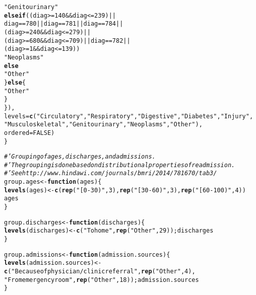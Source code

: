 \documentclass{article}\usepackage[]{graphicx}\usepackage[]{color}
\makeatletter
\newcommand{\hlnum}[1]{\textcolor[rgb]{0.686,0.059,0.569}{#1}}%
\newcommand{\hlstr}[1]{\textcolor[rgb]{0.192,0.494,0.8}{#1}}%
\newcommand{\hlcom}[1]{\textcolor[rgb]{0.678,0.584,0.686}{\textit{#1}}}%
\newcommand{\hlopt}[1]{\textcolor[rgb]{0,0,0}{#1}}%
\newcommand{\hlstd}[1]{\textcolor[rgb]{0.345,0.345,0.345}{#1}}%
\newcommand{\hlkwa}[1]{\textcolor[rgb]{0.161,0.373,0.58}{\textbf{#1}}}%
\newcommand{\hlkwb}[1]{\textcolor[rgb]{0.69,0.353,0.396}{#1}}%
\newcommand{\hlkwc}[1]{\textcolor[rgb]{0.333,0.667,0.333}{#1}}%
\newcommand{\hlkwd}[1]{\textcolor[rgb]{0.737,0.353,0.396}{\textbf{#1}}}%
\newenvironment{kframe}{%
 \def\at@end@of@kframe{}%
 \ifinner\ifhmode%
  \def\at@end@of@kframe{\end{minipage}}%
  \begin{minipage}{\columnwidth}%
 \fi\fi%
 \def\FrameCommand##1{\hskip\@totalleftmargin \hskip-\fboxsep
 \colorbox{shadecolor}{##1}\hskip-\fboxsep
     \hskip-\linewidth \hskip-\@totalleftmargin \hskip\columnwidth}%
 \MakeFramed {\advance\hsize-\width
   \@totalleftmargin\z@ \linewidth\hsize
   \@setminipage}}%
 {\par\unskip\endMakeFramed%
 \at@end@of@kframe}
\newenvironment{knitrout}{}{} %
\makeatother
\begin{document}
\begin{knitrout}
\begin{kframe}
\begin{alltt}
                \hlstr{"Genitourinary"}
            \hlkwa{else if} \hlstd{((diag} \hlopt{>=} \hlnum{140} \hlopt{&&} \hlstd{diag} \hlopt{<=} \hlnum{239}\hlstd{)} \hlopt{||}
                     \hlstd{diag} \hlopt{==} \hlnum{780} \hlopt{||} \hlstd{diag} \hlopt{==} \hlnum{781} \hlopt{||} \hlstd{diag} \hlopt{==} \hlnum{784} \hlopt{||}
                     \hlstd{(diag} \hlopt{>=} \hlnum{240} \hlopt{&&} \hlstd{diag} \hlopt{<=} \hlnum{279}\hlstd{)} \hlopt{||}
                     \hlstd{(diag} \hlopt{>=} \hlnum{680} \hlopt{&&} \hlstd{diag} \hlopt{<=} \hlnum{709}\hlstd{)} \hlopt{||} \hlstd{diag} \hlopt{==} \hlnum{782} \hlopt{||}
                     \hlstd{(diag} \hlopt{>=} \hlnum{1} \hlopt{&&} \hlstd{diag} \hlopt{<=} \hlnum{139}\hlstd{))}
                \hlstr{"Neoplasms"}
            \hlkwa{else}
                \hlstr{"Other"}
        \hlstd{\}} \hlkwa{else} \hlstd{\{}
            \hlstr{"Other"}
        \hlstd{\}}
    \hlstd{\}),}
    \hlkwc{levels}\hlstd{=}\hlkwd{c}\hlstd{(}\hlstr{"Circulatory"}\hlstd{,} \hlstr{"Respiratory"}\hlstd{,} \hlstr{"Digestive"}\hlstd{,} \hlstr{"Diabetes"}\hlstd{,} \hlstr{"Injury"}\hlstd{,}
             \hlstr{"Musculoskeletal"}\hlstd{,} \hlstr{"Genitourinary"}\hlstd{,} \hlstr{"Neoplasms"}\hlstd{,} \hlstr{"Other"}\hlstd{),}
    \hlkwc{ordered}\hlstd{=}\hlnum{FALSE}\hlstd{)}
\hlstd{\}}

\hlcom{#' Grouping of ages, discharges, and admissions.}
\hlcom{#' The grouping is done based on distributional properties of readmission.}
\hlcom{#' See http://www.hindawi.com/journals/bmri/2014/781670/tab3/}
\hlstd{group.ages} \hlkwb{<-} \hlkwa{function} \hlstd{(}\hlkwc{ages}\hlstd{) \{}
    \hlkwd{levels}\hlstd{(ages)} \hlkwb{<-} \hlkwd{c}\hlstd{(}\hlkwd{rep}\hlstd{(}\hlstr{"[0-30)"}\hlstd{,} \hlnum{3}\hlstd{),} \hlkwd{rep}\hlstd{(}\hlstr{"[30-60)"}\hlstd{,} \hlnum{3}\hlstd{),} \hlkwd{rep}\hlstd{(}\hlstr{"[60-100)"}\hlstd{,} \hlnum{4}\hlstd{))}
    \hlstd{ages}
\hlstd{\}}

\hlstd{group.discharges} \hlkwb{<-} \hlkwa{function} \hlstd{(}\hlkwc{discharges}\hlstd{) \{}
    \hlkwd{levels}\hlstd{(discharges)} \hlkwb{<-} \hlkwd{c}\hlstd{(}\hlstr{"To home"}\hlstd{,} \hlkwd{rep}\hlstd{(}\hlstr{"Other"}\hlstd{,} \hlnum{29}\hlstd{)); discharges}
\hlstd{\}}

\hlstd{group.admissions} \hlkwb{<-} \hlkwa{function} \hlstd{(}\hlkwc{admission.sources}\hlstd{) \{}
    \hlkwd{levels}\hlstd{(admission.sources)} \hlkwb{<-}
        \hlkwd{c}\hlstd{(}\hlstr{"Because of physician/clinic referral"}\hlstd{,} \hlkwd{rep}\hlstd{(}\hlstr{"Other"}\hlstd{,} \hlnum{4}\hlstd{),}
          \hlstr{"From emergency room"}\hlstd{,} \hlkwd{rep}\hlstd{(}\hlstr{"Other"}\hlstd{,} \hlnum{18}\hlstd{)); admission.sources}
\hlstd{\}}


\end{alltt}
\end{kframe}
\end{knitrout}
\end{document}
